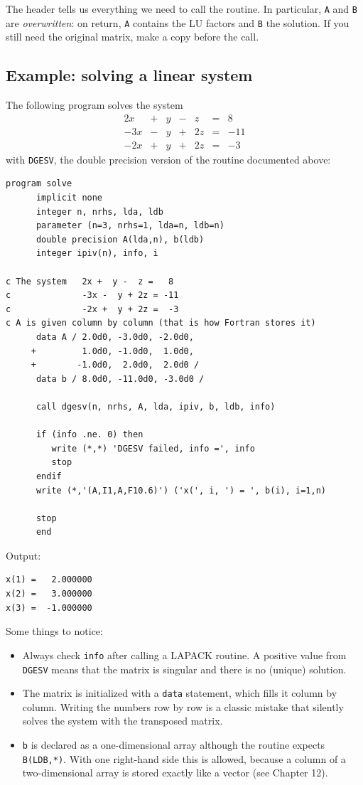 The header tells us everything we need to call the routine. In particular, \texttt{A} and \texttt{B} are \emph{overwritten}: on return, \texttt{A} contains the LU factors and \texttt{B} the solution. If you still need the original matrix, make a copy before the call.

\subsection{Example: solving a linear system}

The following program solves the system
\[
\begin{array}{rcrcrcr}
  2x & + &  y & - &  z & = &   8 \\
 -3x & - &  y & + & 2z & = & -11 \\
 -2x & + &  y & + & 2z & = &  -3
\end{array}
\]
with \texttt{DGESV}, the double precision version of the routine documented above:

\begin{lstlisting}[style=fortran77]
      program solve
      implicit none
      integer n, nrhs, lda, ldb
      parameter (n=3, nrhs=1, lda=n, ldb=n)
      double precision A(lda,n), b(ldb)
      integer ipiv(n), info, i

c The system   2x +  y -  z =   8
c              -3x -  y + 2z = -11
c              -2x +  y + 2z =  -3
c A is given column by column (that is how Fortran stores it)
      data A / 2.0d0, -3.0d0, -2.0d0,
     +         1.0d0, -1.0d0,  1.0d0,
     +        -1.0d0,  2.0d0,  2.0d0 /
      data b / 8.0d0, -11.0d0, -3.0d0 /

      call dgesv(n, nrhs, A, lda, ipiv, b, ldb, info)

      if (info .ne. 0) then
         write (*,*) 'DGESV failed, info =', info
         stop
      endif
      write (*,'(A,I1,A,F10.6)') ('x(', i, ') = ', b(i), i=1,n)

      stop
      end
\end{lstlisting}

Output:

\begin{lstlisting}[style=output]
x(1) =   2.000000
x(2) =   3.000000
x(3) =  -1.000000
\end{lstlisting}

Some things to notice:

\begin{itemize}
    \item Always check \texttt{info} after calling a LAPACK routine. A positive value from \texttt{DGESV} means that the matrix is singular and there is no (unique) solution.
    \item The matrix is initialized with a \texttt{data} statement, which fills it column by column. Writing the numbers row by row is a classic mistake that silently solves the system with the transposed matrix.
    \item \texttt{b} is declared as a one-dimensional array although the routine expects \texttt{B(LDB,*)}. With one right-hand side this is allowed, because a column of a two-dimensional array is stored exactly like a vector (see Chapter 12).
\end{itemize}

